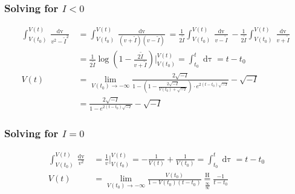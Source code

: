 \subsubsection{Solving for \texorpdfstring{$I < 0$}{TEXT}}
\begin{align*}
\int_{V(t_0)}^{V(t)} \frac{\mathop{dv}}{v^2 - \tilde{I}^2} &= \int_{V(t_0)}^{V(t)} \frac{\mathop{dv}}{(v+\tilde{I})(v-\tilde{I})} 
= \frac{1}{2 \tilde{I}} \int_{V(t_0)}^{V(t)} \frac{\mathop{dv}}{v-\tilde{I}}-\frac{1}{2 \tilde{I}} \int_{V(t_0)}^{V(t)} \frac{\mathop{dv}}{v+\tilde{I}} \\
&= \frac{1}{2 \tilde{I}} \log \left(1-\frac{2 \tilde{I}}{v+\tilde{I}}\right) \Big \rvert_{V(t_0)}^{V(t)} 
= \int_{t_0}^t \mathop{d\tau} = t - t_0 \\
V(t) &= \lim_{V(t_0) \rightarrow -\infty} \frac{2 \sqrt{-I}}{1 - \left(1-\frac{2 \sqrt{-I}}{V(t_0)+\sqrt{-I}}\right)\cdot e^{2 (t - t_0)\sqrt{-I}}}-\sqrt{-I}\\
&= \frac{2 \sqrt{-I}}{1 - e^{2 (t - t_0) \sqrt{-I}}}-\sqrt{-I}
\end{align*}

\subsubsection{Solving for \texorpdfstring{$I = 0$}{TEXT}}
\begin{align*}
\int_{V(t_0)}^{V(t)} \frac{\mathop{dv}}{v^2} &= \frac{1}{v}\Big\rvert_{V(t_0)}^{V(t)} = - \frac{1}{V(t)} + \frac{1}{V(t_0)} = \int_{t_0}^t \mathop{d\tau} = t -t_0 \\
V(t) &= \lim_{V(t_0) \rightarrow - \infty} \frac{V(t_0)}{1-V(t_0)(t - t_0)} \underset{\frac{\infty}{\infty}}{\overset{\mathrm{H}}{=}} \frac{-1}{t - t_0}
\end{align*}

